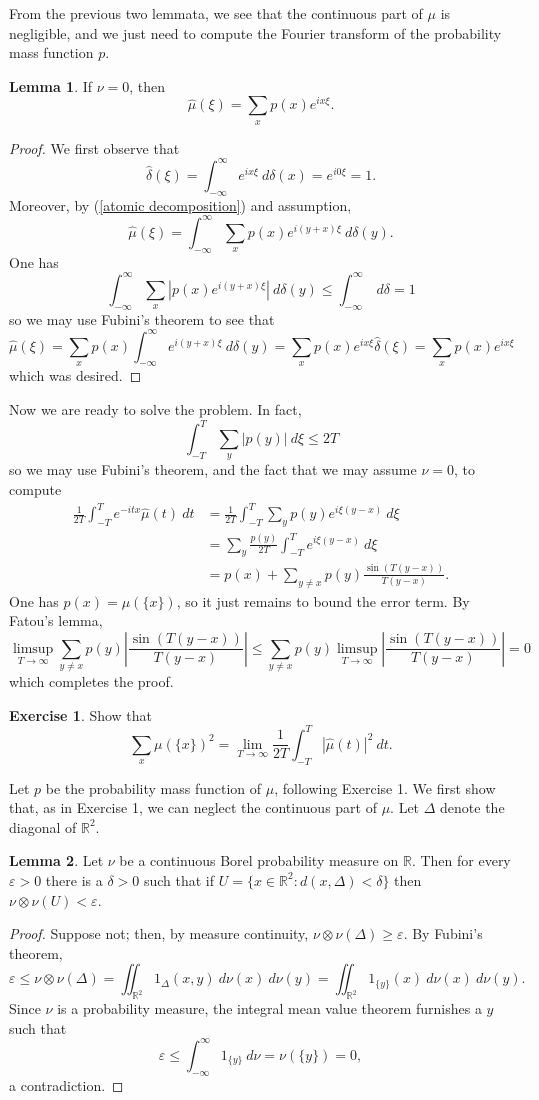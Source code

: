 \documentclass[10pt]{article}
\newcommand{\RR}{\mathbb{R}}
\theoremstyle{definition}
\newtheorem{exer}{Exercise}
\newtheorem{lemma}{Lemma}[exer]
\begin{document}
From the previous two lemmata, we see that the continuous part of $\mu$ is negligible, and we just need to compute the Fourier transform of the probability mass function $p$.
\begin{lemma}
If $\nu = 0$, then
$$\hat \mu(\xi) = \sum_x p(x) e^{ix\xi}.$$
\end{lemma}
\begin{proof}
We first observe that
$$\hat \delta(\xi) = \int_{-\infty}^\infty e^{ix\xi}~d\delta(x) = e^{i0\xi} = 1.$$
Moreover, by (\ref{atomic decomposition}) and assumption,
$$\hat \mu(\xi) = \int_{-\infty}^\infty \sum_x p(x) e^{i(y+x)\xi}~d\delta(y).$$
One has
$$\int_{-\infty}^\infty \sum_x |p(x) e^{i(y+x)\xi}|~d\delta(y) \leq \int_{-\infty}^\infty ~d\delta = 1$$
so we may use Fubini's theorem to see that
$$\hat \mu(\xi) = \sum_x p(x) \int_{-\infty}^\infty e^{i(y+x)\xi}~d\delta(y) = \sum_x p(x)e^{ix\xi} \hat \delta(\xi) = \sum_x p(x)e^{ix\xi}$$
which was desired.
\end{proof}

Now we are ready to solve the problem. In fact,
$$\int_{-T}^T \sum_y |p(y)| ~d\xi \leq 2T$$
so we may use Fubini's theorem, and the fact that we may assume $\nu = 0$, to compute
\begin{align*}
\frac{1}{2T} \int_{-T}^T e^{-itx} \hat \mu(t)~dt &= \frac{1}{2T} \int_{-T}^T \sum_y p(y) e^{i\xi(y-x)} ~d\xi \\
&= \sum_y \frac{p(y)}{2T} \int_{-T}^T e^{i\xi(y-x)}~d\xi \\
&= p(x) + \sum_{y \neq x} p(y) \frac{\sin(T(y-x))}{T(y-x)}.
\end{align*}
One has $p(x) = \mu(\{x\})$, so it just remains to bound the error term. By Fatou's lemma,
$$\limsup_{T \to \infty} \sum_{y \neq x} p(y) \left|\frac{\sin(T(y-x))}{T(y-x)}\right| \leq \sum_{y \neq x} p(y) \limsup_{T \to \infty} \left|\frac{\sin(T(y-x))}{T(y-x)}\right| = 0$$
which completes the proof.

\begin{exer}
Show that
$$\sum_x \mu(\{x\})^2 = \lim_{T \to \infty} \frac{1}{2T} \int_{-T}^T |\hat \mu(t)|^2~dt.$$
\end{exer}

Let $p$ be the probability mass function of $\mu$, following Exercise 1. We first show that, as in Exercise 1, we can neglect the continuous part of $\mu$.
Let $\Delta$ denote the diagonal of $\RR^2$.
\begin{lemma}
Let $\nu$ be a continuous Borel probability measure on $\RR$. Then for every $\varepsilon > 0$ there is a $\delta > 0$ such that if $U = \{x \in \RR^2: d(x, \Delta) < \delta\}$ then $\nu \otimes \nu(U) < \varepsilon$.
\end{lemma}
\begin{proof}
Suppose not; then, by measure continuity, $\nu \otimes \nu(\Delta) \geq \varepsilon$.
By Fubini's theorem,
$$\varepsilon \leq \nu \otimes \nu(\Delta) = \iint_{\RR^2} 1_\Delta(x, y) ~d\nu(x)~d\nu(y) = \iint_{\RR^2} 1_{\{y\}}(x) ~d\nu(x) ~d\nu(y).$$
Since $\nu$ is a probability measure, the integral mean value theorem furnishes a $y$ such that
$$\varepsilon \leq \int_{-\infty}^\infty 1_{\{y\}} ~d\nu = \nu(\{y\}) = 0,$$
a contradiction.
\end{proof}
\end{document}
